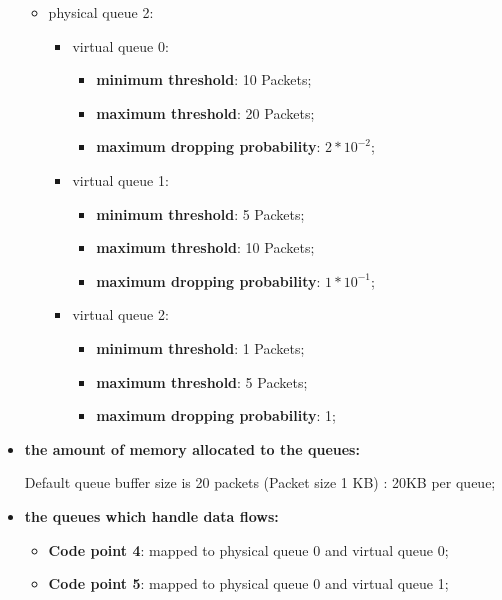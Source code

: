 \documentclass[conference,compsoc]{IEEEtran}
\begin{document}
\begin{itemize}
\begin{itemize}
  \item physical queue 2:
     \begin{itemize}
     	\item virtual queue 0:
     	\begin{itemize}
     		\item \textbf{minimum threshold}: 10 Packets;
		     \item \textbf{maximum threshold}: 20 Packets;
		     \item \textbf{maximum dropping probability}: $2 * 10^{-2}$;
         \end{itemize}
    	 \item virtual queue 1:
   	  \begin{itemize}
     			\item \textbf{minimum threshold}: 5 Packets;
 			    \item \textbf{maximum threshold}: 10 Packets;
   			  \item \textbf{maximum dropping probability}: $1 * 10^{-1}$;
  	   \end{itemize}
	   
	   \item virtual queue 2:
   	  \begin{itemize}
     			\item \textbf{minimum threshold}: 1 Packets;
 			    \item \textbf{maximum threshold}: 5 Packets;
   			  \item \textbf{maximum dropping probability}: 1;
  	   \end{itemize}   
    \end{itemize}

     
     \end{itemize}

     \vspace{5mm}
     \item \textbf{the amount of memory allocated to the queues:}\par

     Default queue buffer size is 20 packets (Packet size 1 KB) : 20KB per queue;


     \vspace{5mm}
     \item \textbf{the queues which handle data flows:}\par
     \begin{itemize}
     \item \textbf{Code point 4}: mapped to physical queue 0 and virtual queue 0;
     \item \textbf{Code point 5}: mapped to physical queue 0 and virtual queue 1;
          

\end{itemize}
\end{itemize}
\end{document}
